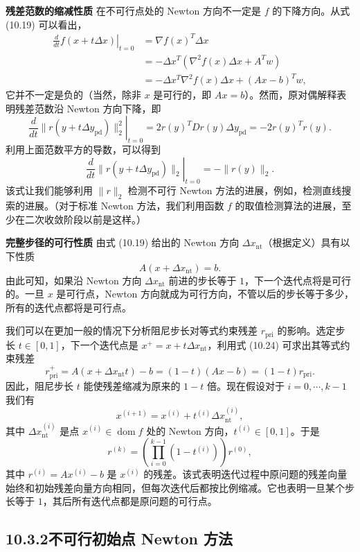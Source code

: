 \documentclass[UTF8,12pt,a4paper,fontset=fandol]{ctexart}
\begin{document}
\noindent\textbf{残差范数的缩减性质}\quad
在不可行点处的 Newton 方向不一定是 $f$ 的下降方向。从式 (10.19) 可以看出，
\[
\begin{aligned}
\left.\frac{d}{dt}f(x+t\Delta x)\right|_{t=0}
&=\nabla f(x)^T\Delta x\\
&=-\Delta x^T(\nabla^2 f(x)\Delta x+A^Tw)\\
&=-\Delta x^T\nabla^2 f(x)\Delta x+(Ax-b)^Tw,
\end{aligned}
\]
它并不一定是负的（当然，除非 $x$ 是可行的，即 $Ax=b$）。然而，原对偶解释表明残差范数沿 Newton 方向下降，即
\[
\left.\frac{d}{dt}\|r(y+t\Delta y_{\mathrm{pd}})\|_2^2\right|_{t=0}
=2r(y)^TDr(y)\Delta y_{\mathrm{pd}}
=-2r(y)^Tr(y).
\]
利用上面范数平方的导数，可以得到
\begin{equation}
\left.\frac{d}{dt}\|r(y+t\Delta y_{\mathrm{pd}})\|_2\right|_{t=0}
=-\|r(y)\|_2.
\tag{10.23}
\end{equation}
该式让我们能够利用 $\|r\|_2$ 检测不可行 Newton 方法的进展，例如，检测直线搜索的进展。（对于标准 Newton 方法，我们利用函数 $f$ 的取值检测算法的进展，至少在二次收敛阶段以前是这样。）

\noindent\textbf{完整步径的可行性质}\quad
由式 (10.19) 给出的 Newton 方向 $\Delta x_{\mathrm{nt}}$（根据定义）具有以下性质
\begin{equation}
A(x+\Delta x_{\mathrm{nt}})=b.
\tag{10.24}
\end{equation}
由此可知，如果沿 Newton 方向 $\Delta x_{\mathrm{nt}}$ 前进的步长等于 $1$，下一个迭代点将是可行的。一旦 $x$ 是可行点，Newton 方向就成为可行方向，不管以后的步长等于多少，所有的迭代点都将是可行点。

我们可以在更加一般的情况下分析阻尼步长对等式约束残差 $r_{\mathrm{pri}}$ 的影响。选定步长 $t\in[0,1]$，下一个迭代点是 $x^+=x+t\Delta x_{\mathrm{nt}}$，利用式 (10.24) 可求出其等式约束残差
\[
r_{\mathrm{pri}}^+=A(x+\Delta x_{\mathrm{nt}}t)-b=(1-t)(Ax-b)=(1-t)r_{\mathrm{pri}}.
\]
因此，阻尼步长 $t$ 能使残差缩减为原来的 $1-t$ 倍。现在假设对于 $i=0,\cdots,k-1$ 我们有
\[
x^{(i+1)}=x^{(i)}+t^{(i)}\Delta x_{\mathrm{nt}}^{(i)},
\]
其中 $\Delta x_{\mathrm{nt}}^{(i)}$ 是点 $x^{(i)}\in\operatorname{dom} f$ 处的 Newton 方向，$t^{(i)}\in[0,1]$。于是
\[
r^{(k)}=\left(\prod_{i=0}^{k-1}(1-t^{(i)})\right)r^{(0)},
\]
其中 $r^{(i)}=Ax^{(i)}-b$ 是 $x^{(i)}$ 的残差。该式表明迭代过程中原问题的残差向量始终和初始残差向量方向相同，但每次迭代后都按比例缩减。它也表明一旦某个步长等于 $1$，其后所有迭代点都是原问题的可行点。

\subsection*{10.3.2\quad 不可行初始点 Newton 方法}
\end{document}
